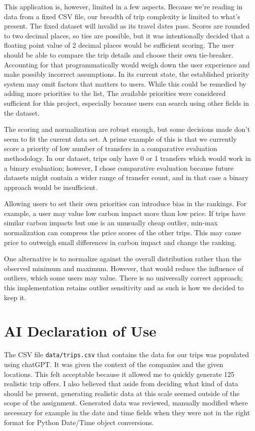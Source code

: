 ﻿\documentclass[11pt]{article}
\begin{document}
This application is, however, limited in a few aspects. Because we're reading in data from a fixed CSV file, our breadth of trip complexity is limited to what's
present. The fixed dataset will invalid as its travel dates pass. Scores are rounded to two decimal places, so ties are possible, 
but it was intentionally decided that a floating point value of 2 decimal places would be sufficient scoring. 
The user should be able to compare the trip details and choose their own tie-breaker.
Accounting for that programmatically would weigh down the user experience and make possibly incorrect assumptions. 
In its current state, the established priority system may omit factors that matters to 
users. While this could be remedied by adding more priorities to the list,
The available priorities were considered sufficient for this project, especially because users can search using other fields in the dataset.

The scoring and normalization are robust enough, but some decisions made don't seem to fit the current data set.
A prime example of this is that we currently score a priority of low number of transfers in a comparative evaluation methodology.
In our dataset, trips only have 0 or 1 transfers which would work in a binary evaluation; however, I chose comparative evaluation 
because future datasets might contain a wider range of transfer count, and in that case a binary approach would be insufficient.

Allowing users to set their own priorities can introduce bias in the rankings. For example, a user may value low carbon impact more than low price. 
If trips have similar carbon impacts but one is an unusually cheap outlier, min-max normalization can compress the price scores of the other trips. 
This may cause price to outweigh small differences in carbon impact and change the ranking.

One alternative is to normalize against the overall distribution rather than the observed minimum and maximum. 
However, that would reduce the influence of outliers, which some users may value. There is no universally correct approach; 
this implementation retains outlier sensitivity and as such is how we decided to keep it.

\newpage
\section{AI Declaration of Use}
The CSV file \texttt{data/trips.csv} that contains the data for our trips was populated using chatGPT. It was given the context of the companies
and the given locations. This felt acceptable because it allowed me to quickly generate 125 realistic trip offers. I also believed that aside from deciding what kind of 
data should be present, generating realistic data at this scale seemed outside of the scope of the assignment.
Generated data was reviewed, manually modified where necessary for example in the date and time fields when they were not in the right format
for Python Date/Time object conversions.
\end{document}

